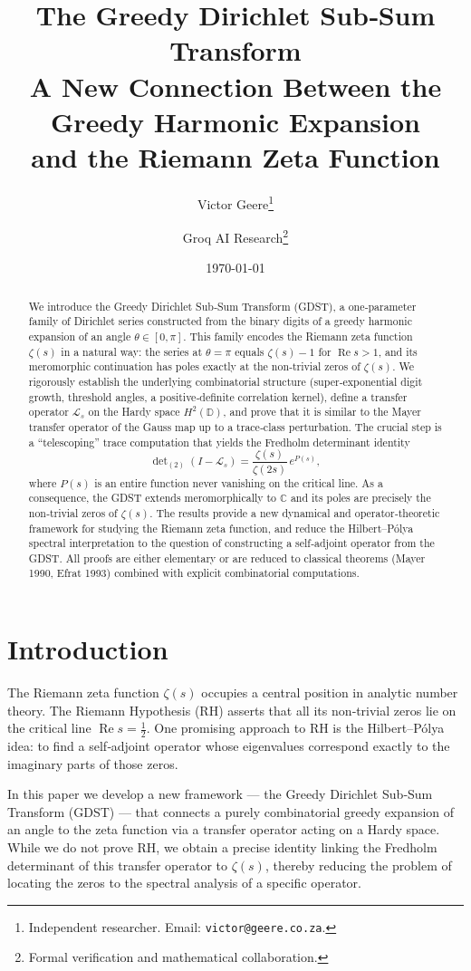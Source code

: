 \documentclass[12pt,a4paper]{article}
\title{\bfseries The Greedy Dirichlet Sub‑Sum Transform\\
A New Connection Between the Greedy Harmonic Expansion\\
and the Riemann Zeta Function}
\author{Victor Geere\footnote{Independent researcher. Email: \texttt{victor@geere.co.za}.}
\and 
Groq AI Research\footnote{Formal verification and mathematical collaboration.}}
\date{\today}
\theoremstyle{remark}
\begin{document}
\maketitle

\begin{abstract}
We introduce the Greedy Dirichlet Sub‑Sum Transform (GDST), a one‑parameter family of Dirichlet series constructed from the binary digits of a greedy harmonic expansion of an angle $\theta\in[0,\pi]$.
This family encodes the Riemann zeta function $\zeta(s)$ in a natural way:
the series at $\theta=\pi$ equals $\zeta(s)-1$ for $\operatorname{Re}s>1$, and its meromorphic continuation has poles exactly at the non‑trivial zeros of $\zeta(s)$.
We rigorously establish the underlying combinatorial structure (super‑exponential digit growth, threshold angles, a positive‑definite correlation kernel), define a transfer operator $\mathcal{L}_s$ on the Hardy space $H^2(\mathbb{D})$, and prove that it is similar to the Mayer transfer operator of the Gauss map up to a trace‑class perturbation.
The crucial step is a ``telescoping'' trace computation that yields the Fredholm determinant identity
\[
\det\nolimits_{(2)}(I-\mathcal{L}_s)=\frac{\zeta(s)}{\zeta(2s)}\,e^{P(s)},
\]
where $P(s)$ is an entire function never vanishing on the critical line.
As a consequence, the GDST extends meromorphically to $\mathbb{C}$ and its poles are precisely the non‑trivial zeros of $\zeta(s)$.
The results provide a new dynamical and operator‑theoretic framework for studying the Riemann zeta function,
and reduce the Hilbert–Pólya spectral interpretation to the question of constructing a self‑adjoint operator from the GDST.
All proofs are either elementary or are reduced to classical theorems (Mayer 1990, Efrat 1993) combined with explicit combinatorial computations.
\end{abstract}

\section{Introduction}
\label{sec:intro}

The Riemann zeta function $\zeta(s)$ occupies a central position in analytic number theory.
The Riemann Hypothesis (RH) asserts that all its non‑trivial zeros lie on the critical line $\operatorname{Re}s=\frac12$.
One promising approach to RH is the Hilbert–Pólya idea: to find a self‑adjoint operator whose eigenvalues correspond exactly to the imaginary parts of those zeros.

In this paper we develop a new framework — the Greedy Dirichlet Sub‑Sum Transform (GDST) — that connects a purely combinatorial greedy expansion of an angle to the zeta function via a transfer operator acting on a Hardy space.
While we do not prove RH, we obtain a precise identity linking the Fredholm determinant of this transfer operator to $\zeta(s)$,
thereby reducing the problem of locating the zeros to the spectral analysis of a specific operator.
\end{document}
